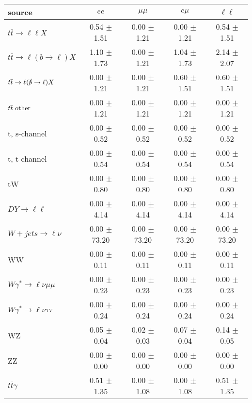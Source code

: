 \begin{tabular}{l|cccc} \hline\hline
source & $ee$ & $\mu\mu$ & $e\mu$ & $\ell\ell $ \\
\hline
$t\overline{t} \rightarrow \ell \ell X$ &  0.54 $\pm$  1.51 &  0.00 $\pm$  1.21 &  0.00 $\pm$  1.21 &  0.54 $\pm$  1.51 \\
$t\overline{t} \rightarrow \ell (b \rightarrow \ell) X$ &  1.10 $\pm$  1.73 &  0.00 $\pm$  1.21 &  1.04 $\pm$  1.73 &  2.14 $\pm$  2.07 \\
$t\overline{t} \rightarrow \ell (\slashed b \rightarrow \ell) X$ &  0.00 $\pm$  1.21 &  0.00 $\pm$  1.21 &  0.60 $\pm$  1.51 &  0.60 $\pm$  1.51 \\
        $t\overline{t}\ \rm{other}$ &  0.00 $\pm$  1.21 &  0.00 $\pm$  1.21 &  0.00 $\pm$  1.21 &  0.00 $\pm$  1.21 \\
\hline
                       t, s-channel &  0.00 $\pm$  0.52 &  0.00 $\pm$  0.52 &  0.00 $\pm$  0.52 &  0.00 $\pm$  0.52 \\
                       t, t-channel &  0.00 $\pm$  0.54 &  0.00 $\pm$  0.54 &  0.00 $\pm$  0.54 &  0.00 $\pm$  0.54 \\
                                 tW &  0.00 $\pm$  0.80 &  0.00 $\pm$  0.80 &  0.00 $\pm$  0.80 &  0.00 $\pm$  0.80 \\
\hline
         $DY \rightarrow \ell \ell$ &  0.00 $\pm$  4.14 &  0.00 $\pm$  4.14 &  0.00 $\pm$  4.14 &  0.00 $\pm$  4.14 \\
      $W+jets \rightarrow \ell \nu$ &  0.00 $\pm$ 73.20 &  0.00 $\pm$ 73.20 &  0.00 $\pm$ 73.20 &  0.00 $\pm$ 73.20 \\
                                 WW &  0.00 $\pm$  0.11 &  0.00 $\pm$  0.11 &  0.00 $\pm$  0.11 &  0.00 $\pm$  0.11 \\
\hline
$W\gamma^{*} \rightarrow \ell \nu \mu\mu$ &  0.00 $\pm$  0.23 &  0.00 $\pm$  0.23 &  0.00 $\pm$  0.23 &  0.00 $\pm$  0.23 \\
$W\gamma^{*} \rightarrow \ell \nu \tau\tau$ &  0.00 $\pm$  0.24 &  0.00 $\pm$  0.24 &  0.00 $\pm$  0.24 &  0.00 $\pm$  0.24 \\
                                 WZ &  0.05 $\pm$  0.04 &  0.02 $\pm$  0.03 &  0.07 $\pm$  0.04 &  0.14 $\pm$  0.05 \\
                                 ZZ &  0.00 $\pm$  0.00 &  0.00 $\pm$  0.00 &  0.00 $\pm$  0.00 &  0.00 $\pm$  0.00 \\
\hline
              $t\overline{t}\gamma$ &  0.51 $\pm$  1.35 &  0.00 $\pm$  1.08 &  0.00 $\pm$  1.08 &  0.51 $\pm$  1.35 \\

\end{tabular}
